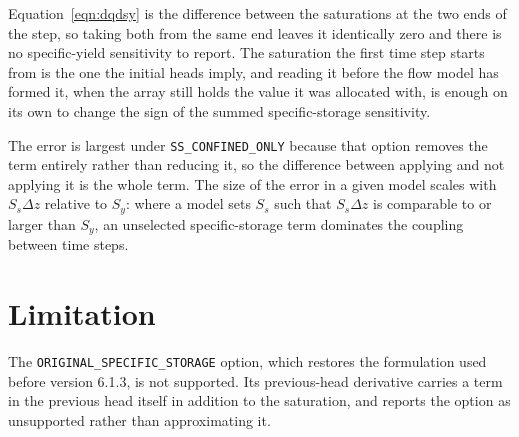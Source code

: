 Equation~\ref{eqn:dqdsy} is the difference between the saturations at the two ends of the step, so taking both from the same end leaves it identically zero and there is no specific-yield sensitivity to report. The saturation the first time step starts from is the one the initial heads imply, and reading it before the flow model has formed it, when the array still holds the value it was allocated with, is enough on its own to change the sign of the summed specific-storage sensitivity.

The error is largest under \texttt{SS\_CONFINED\_ONLY} because that option removes the term entirely rather than reducing it, so the difference between applying and not applying it is the whole term. The size of the error in a given model scales with $S_s \Delta z$ relative to $S_y$: where a model sets $S_s$ such that $S_s \Delta z$ is comparable to or larger than $S_y$, an unselected specific-storage term dominates the coupling between time steps.

\section*{Limitation}

The \texttt{ORIGINAL\_SPECIFIC\_STORAGE} option, which restores the formulation used before \mf{} version 6.1.3, is not supported. Its previous-head derivative carries a term in the previous head itself in addition to the saturation, and \adj{} reports the option as unsupported rather than approximating it.
